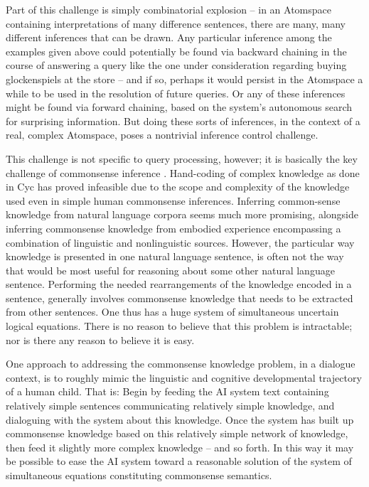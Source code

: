 Part of this challenge is simply combinatorial explosion -- in an Atomspace
containing interpretations of many difference sentences, there are many, many different inferences that can be drawn.  
Any particular inference among the examples given above could potentially be found via backward chaining in the course of answering a query like the one 
under consideration regarding buying glockenspiels at the store -- and if so, perhaps it would persist in the Atomspace
a while to be used in the resolution of future queries.  Or any of these inferences might be found via forward chaining, based on the
system's autonomous search for surprising information.   But doing these sorts of inferences, in the context of a real, complex Atomspace,
poses a nontrivial inference control challenge.   

This challenge is not specific to query processing, however; it is basically 
the key challenge of commonsense inference \cite{RWR}.   Hand-coding of complex knowledge as done in Cyc \cite{Lenat1990}
has proved infeasible due to the scope and complexity of the knowledge used even in simple human commonsense inferences.
Inferring common-sense knowledge from natural language corpora seems much more promising, alongside inferring
commonsense knowledge from embodied experience encompassing a combination of linguistic and nonlinguistic sources.
However, the particular way knowledge is presented in one natural language sentence, is often not the way that would be most useful
for reasoning about some other natural language sentence.  Performing the needed rearrangements of the knowledge encoded
in a sentence, generally involves commonsense knowledge that needs to be extracted from other sentences.  One thus has a 
huge system of simultaneous uncertain logical equations.   There is no reason to believe that this problem is intractable; nor is there
any reason to believe it is easy.  

One approach to addressing the commonsense knowledge problem, in a dialogue context, is to roughly mimic the linguistic
and cognitive developmental trajectory of a human child.  That is: Begin by feeding the AI system text containing relatively
simple sentences communicating relatively simple knowledge, and dialoguing with the system about this knowledge.   Once
the system has built up commonsense knowledge based on this relatively simple network of knowledge, then feed it slightly
more complex knowledge -- and so forth.  In this way it may be possible to ease the AI system toward a reasonable solution
of the system of simultaneous equations constituting commonsense semantics.   

